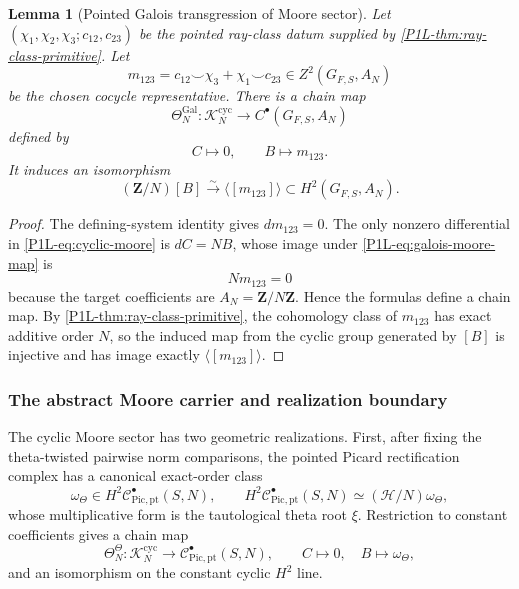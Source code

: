 \documentclass[11pt]{article}
\newtheorem{lemma}[theorem]{Lemma}
\theoremstyle{remark}
\newcommand{\Z}{\mathbf Z}
\providecommand{\C}{\mathcal C}
\providecommand{\Hh}{\mathcal H}
\begin{document}
\begin{lemma}[Pointed Galois transgression of Moore sector]\label{P1L-prop:galois-moore-map}
Let $(\chi_1,\chi_2,\chi_3;c_{12},c_{23})$ be the pointed ray-class datum supplied by \cref{P1L-thm:ray-class-primitive}.  Let
\[
 m_{123}=c_{12}\smile\chi_3+\chi_1\smile c_{23}
 \in Z^2(G_{F,S},A_N)
\]
be the chosen cocycle representative.  There is a chain map
\begin{equation}\label{P1L-eq:galois-moore-map}
 \Theta_N^{\mathrm{Gal}}:
 \mathcal K_N^{\mathrm{cyc}}
 \longrightarrow C^\bullet(G_{F,S},A_N)
\end{equation}
defined by
\[
 C\longmapsto0,
 \qquad
 B\longmapsto m_{123}.
\]
It induces an isomorphism
\[
 (\Z/N)[B]\xrightarrow{\sim}\langle[m_{123}]\rangle
 \subset H^2(G_{F,S},A_N).
\]
\end{lemma}

\begin{proof}
The defining-system identity gives $dm_{123}=0$.  The only nonzero differential in \eqref{P1L-eq:cyclic-moore} is $dC=NB$, whose image under \eqref{P1L-eq:galois-moore-map} is
\[
 N m_{123}=0
\]
because the target coefficients are $A_N=\Z/N\Z$.  Hence the formulas define a chain map.  By \cref{P1L-thm:ray-class-primitive}, the cohomology class of $m_{123}$ has exact additive order $N$, so the induced map from the cyclic group generated by $[B]$ is injective and has image exactly $\langle[m_{123}]\rangle$.
\end{proof}

\subsubsection{The abstract Moore carrier and realization boundary}

The cyclic Moore sector has two geometric realizations.  First, after fixing the theta-twisted pairwise norm comparisons, the pointed Picard rectification complex has a canonical exact-order class
\[
 \omega_\Theta\in H^2\C^\bullet_{\mathrm{Pic,pt}}(S,N),
 \qquad
 H^2\C^\bullet_{\mathrm{Pic,pt}}(S,N)
 \simeq (\Hh/N)\omega_\Theta,
\]
whose multiplicative form is the tautological theta root $\xi$.  Restriction to constant coefficients gives a chain map
\begin{equation}\label{P1L-eq:pic-moore-map}
 \Theta_N^{\Theta}:\mathcal K_N^{\mathrm{cyc}}
 \longrightarrow\C^\bullet_{\mathrm{Pic,pt}}(S,N),
 \qquad C\mapsto0,\quad B\mapsto\omega_\Theta,
\end{equation}
and an isomorphism on the constant cyclic $H^2$ line.
\end{document}
